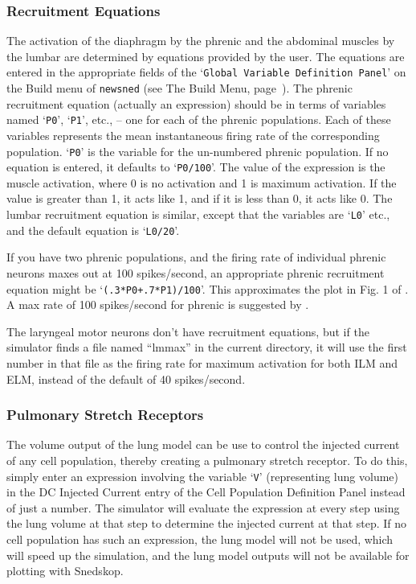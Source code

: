 \documentclass[12pt,openany,oneside]{book}
\newcommand{\ticommand}[1]{\texttt{#1}}
\newcommand{\tisamp}[1]{`\texttt{#1}'}
\newcommand{\tiref}[1]{#1, page~\pageref{#1}}
\begin{document}
\subsubsection{Recruitment Equations}
\label{Recruitment Equations}

The activation of the diaphragm by the phrenic and the abdominal
muscles by the lumbar are determined by equations provided by the
user.  The equations are entered in the appropriate fields of the
\tisamp{Global Variable Definition Panel} on the Build menu of
\ticommand{newsned} (see \tiref{The Build Menu}).  The phrenic
recruitment equation (actually an expression) should be in terms of
variables named \tisamp{P0}, \tisamp{P1}, etc., -- one for each of the
phrenic populations.  Each of these variables represents the mean
instantaneous firing rate of the corresponding population.
\tisamp{P0} is the variable for the un-numbered phrenic population.
If no equation is entered, it defaults to \tisamp{P0/100}.  The value
of the expression is the muscle activation, where 0 is no activation
and 1 is maximum activation.  If the value is greater than 1, it acts
like 1, and if it is less than 0, it acts like 0.  The lumbar
recruitment equation is similar, except that the variables are
\tisamp{L0} etc., and the default equation is \tisamp{L0/20}.

If you have two phrenic populations, and the firing rate of individual
phrenic neurons maxes out at 100 spikes/second, an appropriate phrenic
recruitment equation might be \tisamp{(.3*P0+.7*P1)/100}.  This
approximates the plot in Fig. 1 of \citet{Mantilla201157}.
A max rate of 100 spikes/second for phrenic is suggested by
\citet{springerlink:10.1007/BF00235915}.

The laryngeal motor neurons don't have recruitment equations, but if the
simulator finds a file named ``lmmax'' in the current directory, it will
use the first number in that file as the firing rate for maximum
activation for both ILM and ELM, instead of the default of 40
spikes/second.

\subsubsection{Pulmonary Stretch Receptors}

The volume output of the lung model can be use to control the injected
current of any cell population, thereby creating a pulmonary stretch
receptor.  To do this, simply enter an expression involving the variable
\tisamp{V} (representing lung volume) in the DC Injected Current entry of
the Cell Population Definition Panel instead of just a number.  The
simulator will evaluate the expression at every step using the lung
volume at that step to determine the injected current at that step.  If
no cell population has such an expression, the lung model will not be
used, which will speed up the simulation, and the lung model outputs
will not be available for plotting with Snedskop.
\end{document}
